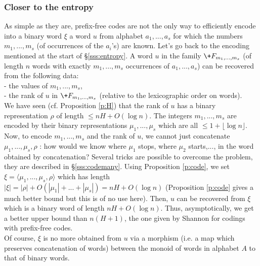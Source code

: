 \subsubsection{Closer to the entropy}\label{sss:closer}
As simple as they are, prefix-free codes are not the only way
to efficiently encode into a binary word $\xi$ a word $u$ from
alphabet $a_1,...,a_s$ for which the numbers $m_1,...,m_s$
(of occurrences of the $a_i$'s) are known.
Let's go back to the encoding mentioned at the start of
\S\ref{sss:entropy}.
A word $u$ in the family $\+F_{m_1,...,m_s}$
(of length $n$ words with exactly $m_1,...,m_s$ occurrences
of $a_1,...,a_s$)
can be recovered from the following data:
\\- the values of $m_1,...,m_s$,
\\- the rank of $u$ in $\+F_{m_1,...,m_s}$
    (relative to the lexicographic order on words).
\\
We have seen (cf. Proposition \ref{p:H})
that the rank of $u$ has a binary representation $\rho$
of length $\leq nH+O(\log n)$.
The integers $m_1,...,m_s$ are encoded by their binary
representations $\mu_1,...,\mu_s$ which are all
$\leq 1+\lfloor\log n\rfloor$.
Now, to encode $m_1,...,m_s$ and the rank of $u$, we cannot
just concatenate $\mu_1,...,\mu_s,\rho$ : how would we know
where $\mu_1$ stops, where $\mu_2$ starts,...,
in the word obtained by concatenation?
Several tricks are possible to overcome the problem,
they are described in \S\ref{sss:codemany}.
Using Proposition \ref{p:code}, we set
$\xi = \langle \mu_1,...,\mu_s,\rho \rangle$
which has length
$|\xi| = |\rho|+O(|\mu_1|+...+|\mu_s|) = nH +O(\log n)$
(Proposition \ref{p:code} gives a much better bound but this is
of no use here).
Then, $u$ can be recovered from $\xi$ which is a binary word
of length $nH+O(\log n)$.
Thus, asymptotically, we get a better upper bound than $n(H+1)$,
the one given by Shannon for codings with prefix-free codes.
\\
Of course, $\xi$ is no more obtained from $u$ via a morphism
(i.e. a map which preserves concatenation of words)
between the monoid of words in alphabet $A$ to that of binary words.
